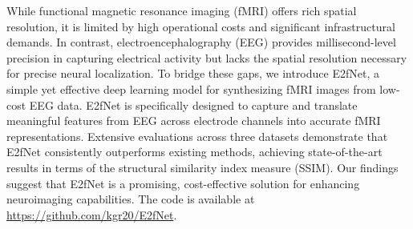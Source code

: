 While functional magnetic resonance imaging (fMRI) offers rich spatial resolution, it is limited by high operational costs and significant infrastructural demands. 
In contrast, electroencephalography (EEG) provides millisecond-level precision in capturing electrical activity but lacks the spatial resolution necessary for precise neural localization. 
To bridge these gaps, we introduce E2fNet, a simple yet effective deep learning model for synthesizing fMRI images from low-cost EEG data. 
E2fNet is specifically designed to capture and translate meaningful features from EEG across electrode channels into accurate fMRI representations. 
Extensive evaluations across three datasets demonstrate that E2fNet consistently outperforms existing methods, achieving state-of-the-art results in terms of the structural similarity index measure (SSIM). 
Our findings suggest that E2fNet is a promising, cost-effective solution for enhancing neuroimaging capabilities. 
The code is available at \url{https://github.com/kgr20/E2fNet}.